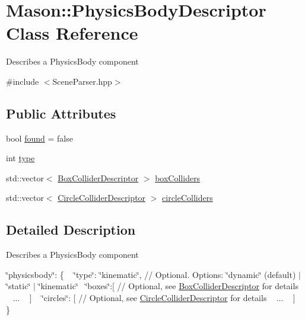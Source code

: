 \hypertarget{class_mason_1_1_physics_body_descriptor}{}\section{Mason\+:\+:Physics\+Body\+Descriptor Class Reference}
\label{class_mason_1_1_physics_body_descriptor}


Describes a Physics\+Body component ~\newline
  




{\ttfamily \#include $<$Scene\+Parser.\+hpp$>$}

\subsection*{Public Attributes}
\begin{DoxyCompactItemize}
\item 
bool \hyperlink{class_mason_1_1_physics_body_descriptor_aa2f258b6d07e44ce6bf4ccbea346f81d}{found} = false
\item 
int \hyperlink{class_mason_1_1_physics_body_descriptor_a30086565a0e9d3ec8c27366d852f333f}{type}
\item 
std\+::vector$<$ \hyperlink{class_mason_1_1_box_collider_descriptor}{Box\+Collider\+Descriptor} $>$ \hyperlink{class_mason_1_1_physics_body_descriptor_a5bf7d827bc6c3008e60d7eb596ff8f0b}{box\+Colliders}
\item 
std\+::vector$<$ \hyperlink{class_mason_1_1_circle_collider_descriptor}{Circle\+Collider\+Descriptor} $>$ \hyperlink{class_mason_1_1_physics_body_descriptor_ade73d134aefec863d829a2bc09712b84}{circle\+Colliders}
\end{DoxyCompactItemize}


\subsection{Detailed Description}
Describes a Physics\+Body component ~\newline
 

\char`\"{}physicsbody\char`\"{}\+: \{ ~\newline
 \char`\"{}type\char`\"{}\+: \char`\"{}kinematic\char`\"{}, // Optional. Options\+: \char`\"{}dynamic\char`\"{} (default) $\vert$ \char`\"{}static\char`\"{} $\vert$ \char`\"{}kinematic\char`\"{}~\newline
 \char`\"{}boxes\char`\"{}\+:\mbox{[} // Optional, see \hyperlink{class_mason_1_1_box_collider_descriptor}{Box\+Collider\+Descriptor} for details ~\newline
 ... ~\newline
 \mbox{]} ~\newline
 \char`\"{}circles\char`\"{}\+: \mbox{[} // Optional, see \hyperlink{class_mason_1_1_circle_collider_descriptor}{Circle\+Collider\+Descriptor} for details ~\newline
 ... ~\newline
 \mbox{]} ~\newline
 \} 


